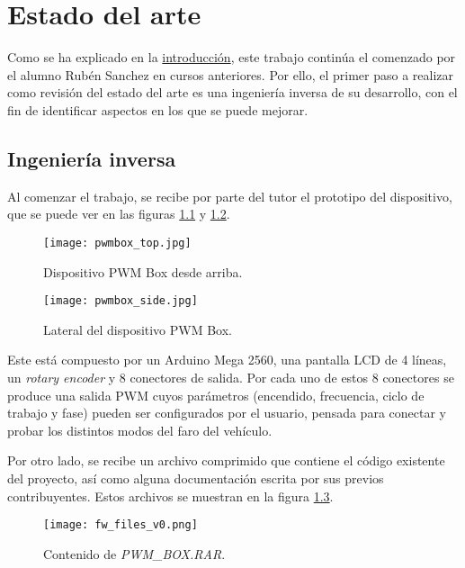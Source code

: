 \chapter{Estado del arte}
\label{ch:estado_del_arte}

Como se ha explicado en la \hyperref[ch:introduccion]{introducción}, este trabajo continúa el comenzado por el alumno Rubén Sanchez en cursos anteriores. Por ello, el primer paso a realizar como revisión del estado del arte es una ingeniería inversa de su desarrollo, con el fin de identificar aspectos en los que se puede mejorar.

\section{Ingeniería inversa}
\label{sec:inginv}

Al comenzar el trabajo, se recibe por parte del tutor el prototipo del dispositivo, que se puede ver en las figuras \ref{fig:pwmbox_top} y \ref{fig:pwmbox_side}.

\begin{figure}[h!]
    \centering
    \texttt{[image: pwmbox\_top.jpg]}
    \caption{Dispositivo PWM Box desde arriba.}
    \label{fig:pwmbox_top}
\end{figure}

\begin{figure}[h!]
    \centering
    \texttt{[image: pwmbox\_side.jpg]}
    \caption{Lateral del dispositivo PWM Box.}
    \label{fig:pwmbox_side}
\end{figure}

Este está compuesto por un Arduino Mega 2560, una pantalla LCD de 4 líneas, un \textit{rotary encoder} y 8 conectores de salida. Por cada uno de estos 8 conectores se produce una salida PWM cuyos parámetros (encendido, frecuencia, ciclo de trabajo y fase) pueden ser configurados por el usuario, pensada para conectar y probar los distintos modos del faro del vehículo.

Por otro lado, se recibe un archivo comprimido que contiene el código existente del proyecto, así como alguna documentación escrita por sus previos contribuyentes. Estos archivos se muestran en la figura \ref{fig:fw_v0}.

\begin{figure}[ht]
    \centering
    \texttt{[image: fw\_files\_v0.png]}
    \caption{Contenido de \textit{PWM\_BOX.RAR}.}
    \label{fig:fw_v0}
\end{figure}

